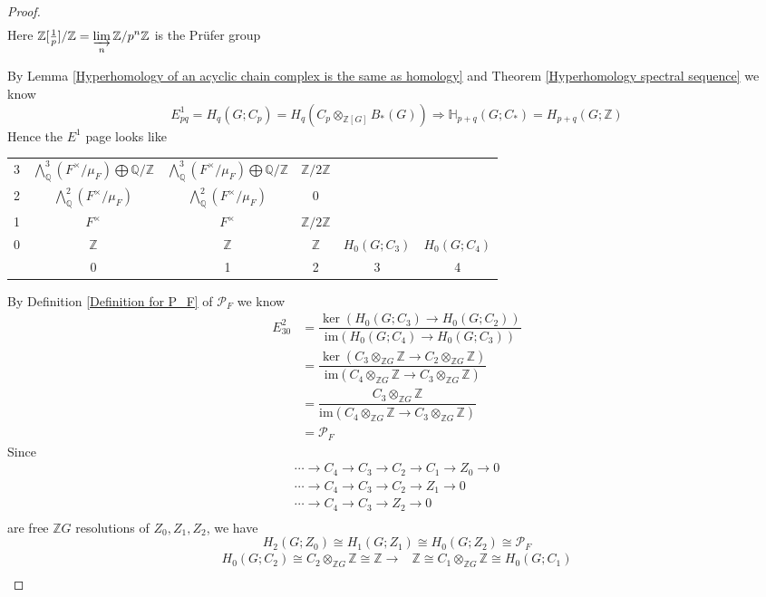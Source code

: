 \documentclass[../main.tex]{subfiles}
\begin{document}
\begin{proof}
\begin{align*}
\end{align*}
Here $\mathbb Z[\frac{1}{p}]/\mathbb Z=\displaystyle\varinjlim_n\mathbb Z/p^n\mathbb Z$ is the Pr\"ufer group \par
By Lemma \ref{Hyperhomology of an acyclic chain complex is the same as homology} and Theorem \ref{Hyperhomology spectral sequence} we know
\[E^1_{pq}=H_q(G;C_p)=H_q(C_p\otimes_{\mathbb Z[G]}B_*(G))\Rightarrow \mathbb H_{p+q}(G;C_*)=H_{p+q}(G;\mathbb Z)\]
Hence the $E^1$ page looks like
\begin{center}
\begin{tabular}{c|ccccc}
3&$\bigwedge^3_{\mathbb Q}(F^\times/\mu_{F})\bigoplus \mathbb Q/\mathbb Z$&$\bigwedge^3_{\mathbb Q}(F^\times/\mu_{F})\bigoplus \mathbb Q/\mathbb Z$&$\mathbb Z/2\mathbb Z$&& \\
2&$\bigwedge^2_{\mathbb Q}(F^\times/\mu_{F})$&$\bigwedge^2_{\mathbb Q}(F^\times/\mu_{F})$&$0$&& \\
1&$F^\times$&$F^\times$&$\mathbb Z/2\mathbb Z$&& \\
0&$\mathbb Z$&$\mathbb Z$&$\mathbb Z$&$H_0(G;C_3)$&$H_0(G;C_4)$ \\
\hline
&0&1&2&3&4
\end{tabular}
\end{center}
By Definition \ref{Definition for P_F} of $\mathcal P_F$ we know
\begin{align*}
E^2_{30}&=\dfrac{\ker(H_0(G;C_3)\to H_0(G;C_2))}{\mathrm{im}(H_0(G;C_4)\to H_0(G;C_3))} \\
&=\dfrac{\ker(C_3\otimes_{\mathbb ZG}\mathbb Z\to C_2\otimes_{\mathbb ZG}\mathbb Z)}{\mathrm{im}(C_4\otimes_{\mathbb ZG}\mathbb Z\to C_3\otimes_{\mathbb ZG}\mathbb Z)} \\
&=\dfrac{C_3\otimes_{\mathbb ZG}\mathbb Z}{\mathrm{im}(C_4\otimes_{\mathbb ZG}\mathbb Z\to C_3\otimes_{\mathbb ZG}\mathbb Z)} \\
&=\mathcal P_F
\end{align*}
Since
\begin{align*}
\cdots\to C_4\to C_3\to C_2\to C_1\to Z_0\to0 \\
\cdots\to C_4\to C_3\to C_2\to Z_1\to0 \\
\cdots\to C_4\to C_3\to Z_2\to0 \\
\end{align*}
are free $\mathbb ZG$ resolutions of $Z_0,Z_1,Z_2$, we have
\[H_2(G;Z_0)\cong H_1(G;Z_1)\cong H_0(G;Z_2)\cong\mathcal P_F\]
\begin{align*}
H_0(G;C_2)\cong C_2\otimes_{\mathbb ZG}\mathbb Z\cong\mathbb Z\to&\mathbb Z\cong C_1\otimes_{\mathbb ZG}\mathbb Z\cong H_0(G;C_1) \\

\end{align*}
\end{proof}
\end{document}
